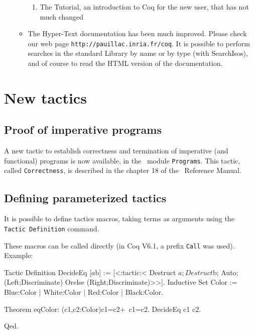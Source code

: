 \documentclass[11pt]{article}
\begin{document}
\begin{itemize}
\begin{itemize}
\begin{enumerate}
    \item The Tutorial, an introduction to Coq for the new user, that
      has not much changed
    \end{enumerate}

  \item The Hyper-Text documentation has been much improved. Please
    check our web page \verb!http://pauillac.inria.fr/coq!. It is
    possible to perform searches in the standard Library by name or by
    type (with SearchIsos), and of course to read the HTML version
    of the documentation.
  \end{itemize}

\end{itemize}

\section{New tactics}


\subsection{Proof of imperative programs}

A new tactic to establish correctness and termination of imperative
(and functional) programs is now available, in the \Coq\ module
\texttt{Programs}. This tactic, called \texttt{Correctness}, is
described in the chapter 18 of the \Coq\ Reference Manual.


\subsection{Defining parameterized tactics}
\label{parameterised}
It is possible to define tactics macros, taking terms as arguments
using the \texttt{Tactic Definition} command. 

These macros can be called directly (in Coq V6.1, a prefix
\texttt{Call} was used).
Example:

\begin{coq_example*}
Tactic Definition DecideEq [$a $b] := 
   [<:tactic:<
      Destruct $a;
      Destruct $b;
      Auto;
      (Left;Discriminate) Orelse (Right;Discriminate)>>].
Inductive Set Color := Blue:Color | White:Color | Red:Color | Black:Color.
\end{coq_example*}

\begin{coq_example}
Theorem eqColor: (c1,c2:Color){c1=c2}+{~c1=c2}.
DecideEq c1 c2.
\end{coq_example}
\begin{coq_example*}
Qed.
\end{coq_example*}
\end{document}
